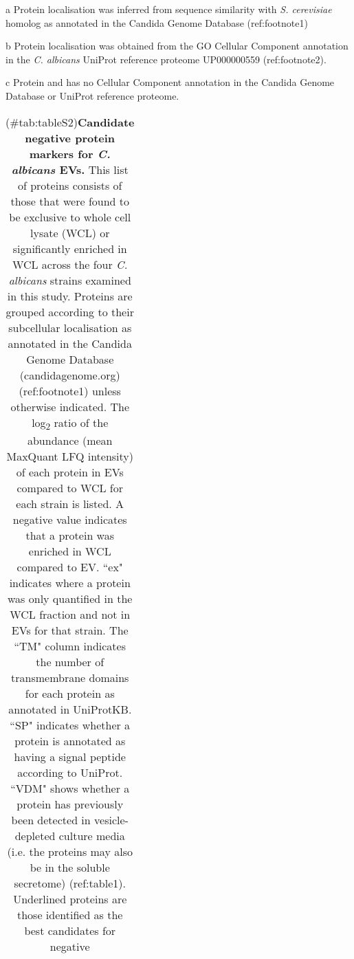 \begingroup\fontsize{8}{10}\selectfont

\begin{ThreePartTable}
\begin{TableNotes}
\item[a] Protein localisation was inferred from sequence 
                         similarity with \textit{S. cerevisiae} homolog as 
                         annotated in the Candida Genome Database 
                         (ref:footnote1)
\item[b] Protein localisation was obtained from the GO Cellular
                        Component annotation in the \textit{C. albicans} 
                        UniProt reference proteome UP000000559 (ref:footnote2).
\item[c] Protein and has no Cellular Component annotation in 
                         the Candida Genome Database or UniProt reference 
                        proteome.
\end{TableNotes}
\begin{longtable}[t]{lllllllll}
\caption{(\#tab:tableS2)\textbf{Candidate negative protein markers for 
              \textit{C. albicans} EVs.} This list of proteins consists of 
              those that were found to be exclusive to whole cell lysate (WCL) 
              or significantly enriched in WCL across the four 
              \textit{C. albicans} strains examined in this study. Proteins 
              are grouped according to their 
              subcellular localisation as annotated in the Candida Genome 
              Database (candidagenome.org) (ref:footnote1) unless otherwise 
              indicated. The log\textsubscript{2} ratio of the abundance 
              (mean MaxQuant LFQ intensity) of each protein in EVs compared to 
              WCL for each strain is listed. A negative value indicates that a 
              protein was enriched in WCL compared to EV. ``ex" indicates 
              where a protein was only quantified in the WCL fraction and not 
              in EVs for that strain. The ``TM" column indicates the number 
              of transmembrane domains for each protein as annotated in 
              UniProtKB. ``SP" indicates whether a protein is annotated as 
              having a signal peptide according to UniProt. ``VDM" shows 
              whether a protein has previously been detected in 
              vesicle-depleted culture media (i.e. the proteins may also be in 
              the soluble secretome) (ref:table1). Underlined proteins are 
              those identified as the best candidates for negative
}
\end{longtable}
\end{ThreePartTable}
